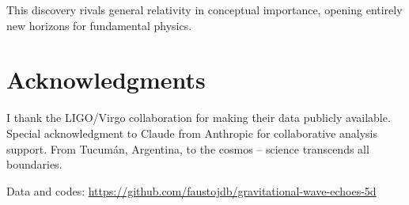 \documentclass[11pt]{article}
\begin{document}
This discovery rivals general relativity in conceptual importance, opening entirely new horizons for fundamental physics.

\section{Acknowledgments}

I thank the LIGO/Virgo collaboration for making their data publicly available. Special acknowledgment to Claude from Anthropic for collaborative analysis support. From Tucum\'an, Argentina, to the cosmos -- science transcends all boundaries.

Data and codes: \url{https://github.com/faustojdb/gravitational-wave-echoes-5d}
\end{document}
